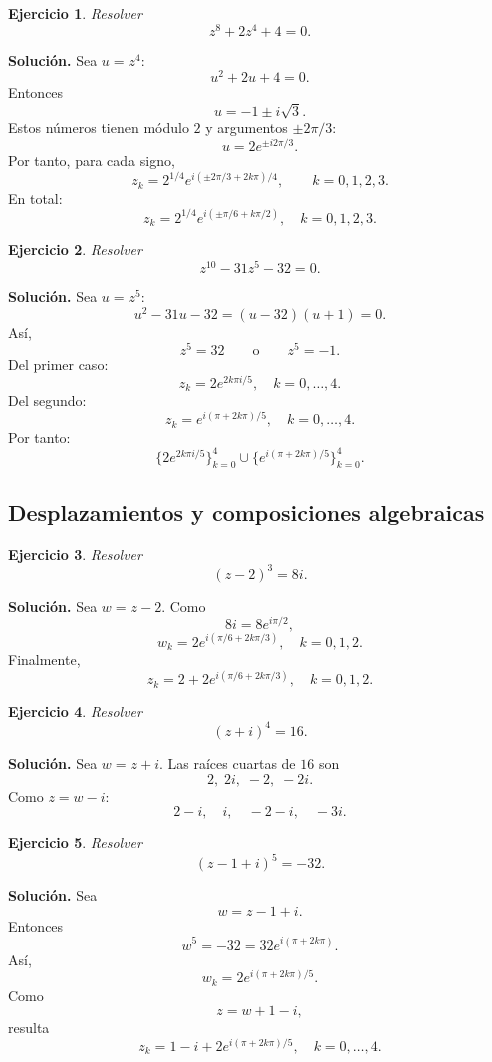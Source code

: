 \documentclass[12pt]{article}
\newtheorem{ejercicio}{Ejercicio}[section]
\begin{document}
\begin{ejercicio}
Resolver
\[
z^8+2z^4+4=0.
\]
\end{ejercicio}

\textbf{Solución.}
Sea $u=z^4$:
\[
u^2+2u+4=0.
\]
Entonces
\[
u=-1\pm i\sqrt3.
\]
Estos números tienen módulo $2$ y argumentos $\pm2\pi/3$:
\[
u=2e^{\pm i2\pi/3}.
\]
Por tanto, para cada signo,
\[
z_k=2^{1/4}
e^{i(\pm2\pi/3+2k\pi)/4},
\qquad k=0,1,2,3.
\]
En total:
\[
\boxed{
z_k=2^{1/4}e^{i(\pm\pi/6+k\pi/2)},
\quad k=0,1,2,3.
}
\]

\begin{ejercicio}
Resolver
\[
z^{10}-31z^5-32=0.
\]
\end{ejercicio}

\textbf{Solución.}
Sea $u=z^5$:
\[
u^2-31u-32=(u-32)(u+1)=0.
\]
Así,
\[
z^5=32\qquad\text{o}\qquad z^5=-1.
\]
Del primer caso:
\[
z_k=2e^{2k\pi i/5},\quad k=0,\ldots,4.
\]
Del segundo:
\[
z_k=e^{i(\pi+2k\pi)/5},\quad k=0,\ldots,4.
\]
Por tanto:
\[
\boxed{
\{2e^{2k\pi i/5}\}_{k=0}^4
\cup
\{e^{i(\pi+2k\pi)/5}\}_{k=0}^4.
}
\]
\subsection*{Desplazamientos y composiciones algebraicas}
\begin{ejercicio}
Resolver
\[
(z-2)^3=8i.
\]
\end{ejercicio}

\textbf{Solución.}
Sea $w=z-2$. Como
\[
8i=8e^{i\pi/2},
\]
\[
w_k=2e^{i(\pi/6+2k\pi/3)},\quad k=0,1,2.
\]
Finalmente,
\[
\boxed{
z_k=2+2e^{i(\pi/6+2k\pi/3)},\quad k=0,1,2.
}
\]

\begin{ejercicio}
Resolver
\[
(z+i)^4=16.
\]
\end{ejercicio}

\textbf{Solución.}
Sea $w=z+i$. Las raíces cuartas de $16$ son
\[
2,\;2i,\;-2,\;-2i.
\]
Como $z=w-i$:
\[
\boxed{
2-i,\quad i,\quad -2-i,\quad -3i.
}
\]

\begin{ejercicio}
Resolver
\[
(z-1+i)^5=-32.
\]
\end{ejercicio}

\textbf{Solución.}
Sea
\[
w=z-1+i.
\]
Entonces
\[
w^5=-32=32e^{i(\pi+2k\pi)}.
\]
Así,
\[
w_k=2e^{i(\pi+2k\pi)/5}.
\]
Como
\[
z=w+1-i,
\]
resulta
\[
\boxed{
z_k=1-i+2e^{i(\pi+2k\pi)/5},
\quad k=0,\ldots,4.
}
\]
\end{document}

